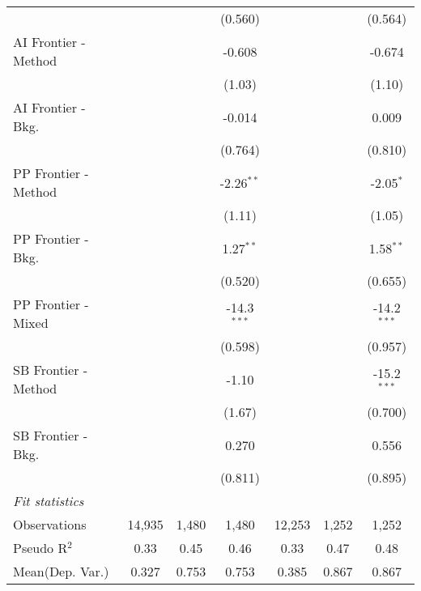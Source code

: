 \begin{tabular}{lcccccc}
                        &                &         & (0.560)       &                &         & (0.564)\\   
   AI Frontier - Method &                &         & -0.608        &                &         & -0.674\\   
                        &                &         & (1.03)        &                &         & (1.10)\\   
   AI Frontier - Bkg.   &                &         & -0.014        &                &         & 0.009\\   
                        &                &         & (0.764)       &                &         & (0.810)\\   
   PP Frontier - Method &                &         & -2.26$^{**}$  &                &         & -2.05$^{*}$\\   
                        &                &         & (1.11)        &                &         & (1.05)\\   
   PP Frontier - Bkg.   &                &         & 1.27$^{**}$   &                &         & 1.58$^{**}$\\   
                        &                &         & (0.520)       &                &         & (0.655)\\   
   PP Frontier - Mixed  &                &         & -14.3$^{***}$ &                &         & -14.2$^{***}$\\   
                        &                &         & (0.598)       &                &         & (0.957)\\   
   SB Frontier - Method &                &         & -1.10         &                &         & -15.2$^{***}$\\   
                        &                &         & (1.67)        &                &         & (0.700)\\   
   SB Frontier - Bkg.   &                &         & 0.270         &                &         & 0.556\\   
                        &                &         & (0.811)       &                &         & (0.895)\\   
   \midrule
   \emph{Fit statistics}\\
   Observations         & 14,935         & 1,480   & 1,480         & 12,253         & 1,252   & 1,252\\  
   Pseudo R$^2$         & 0.33           & 0.45    & 0.46          & 0.33           & 0.47    & 0.48\\  
Mean(Dep. Var.) & 0.327 & 0.753 & 0.753 & 0.385 & 0.867 & 0.867 \\
   

\end{tabular}
